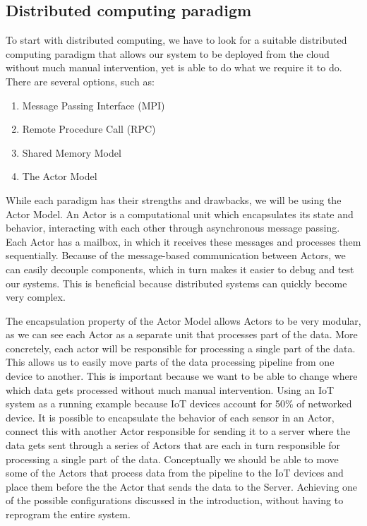 \documentclass[a4paper]{article}
\begin{document}
\subsection{Distributed computing paradigm}
To start with distributed computing, we have to look for a suitable distributed computing paradigm that allows our system to be deployed from the cloud without much manual intervention, yet is able to do what we require it to do. There are several options, such as:
\begin{enumerate}
    \item Message Passing Interface (MPI)\cite{MPI}
    \item Remote Procedure Call (RPC)\cite{RPC}
    \item Shared Memory Model\cite{SMM}
    \item The Actor Model\cite{ActorModel}
\end{enumerate}
While each paradigm has their strengths and drawbacks, we will be using the Actor Model. An Actor is a computational unit which encapsulates its state and behavior, interacting with each other through asynchronous message passing. Each Actor has a mailbox, in which it receives these messages and processes them sequentially. Because of the message-based communication between Actors, we can easily decouple components, which in turn makes it easier to debug and test our systems. This is beneficial because distributed systems can quickly become very complex.

The encapsulation property of the Actor Model allows Actors to be very modular, as we can see each Actor as a separate unit that processes part of the data. More concretely, each actor will be responsible for processing a single part of the data. This allows us to easily move parts of the data processing pipeline from one device to another. This is important because we want to be able to change where which data gets processed without much manual intervention. Using an IoT system as a running example because IoT devices account for 50\% of networked device\cite{differentnetworkneedsiot}. It is possible to encapsulate the behavior of each sensor in an Actor, connect this with another Actor responsible for sending it to a server where the data gets sent through a series of Actors that are each in turn responsible for processing a single part of the data. 
Conceptually we should be able to move some of the Actors that process data from the pipeline to the IoT devices and place them before the the Actor that sends the data to the Server. Achieving one of the possible configurations discussed in the introduction, without having to reprogram the entire system.
\end{document}
